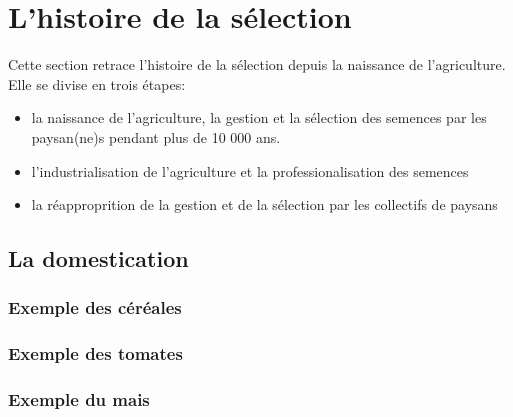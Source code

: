\section{L'histoire de la sélection}
Cette section retrace l'histoire de la sélection depuis la naissance de l'agriculture.
Elle se divise en trois étapes:
\begin{itemize}
\item la naissance de l'agriculture, la gestion et la sélection des semences par les paysan(ne)s pendant plus de 10 000 ans.
\item l'industrialisation de l'agriculture et la professionalisation des semences
\item la réapproprition de la gestion et de la sélection par les collectifs de paysans
\end{itemize}

\subsection{La domestication}

\subsubsection{Exemple des céréales}

\subsubsection{Exemple des tomates}

\subsubsection{Exemple du mais}


